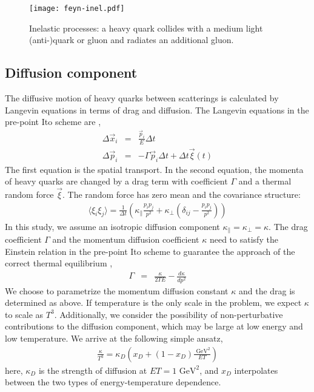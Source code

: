 \documentclass[aps, prc, reprint, amsmath, groupedaddress, nofootinbib]{revtex4-1}
\newcommand{\Kpara}{\kappa_{\|}}
\newcommand{\Kperp}{\kappa_{\perp}}
\begin{document}
\begin{figure}
\texttt{[image: feyn-inel.pdf]}
\caption{Inelastic processes: a heavy quark collides with a medium light (anti-)quark or gluon and radiates an additional gluon.}\label{plots:feyn-inelastic}
\end{figure}

\subsection{Diffusion component}
The diffusive motion of heavy quarks between scatterings is calculated by   Langevin equations in terms of drag and diffusion.
The Langevin equations in the pre-point Ito scheme are \cite{Rapp:2009my},
\begin{eqnarray}
\Delta \vec{x}_i &=& \frac{\vec{p}_i}{E} \Delta t	\\
\Delta \vec{p}_i &=& -\Gamma \vec{p}_i \Delta t + \Delta t \vec{\xi}(t)
\end{eqnarray}
The first equation is the spatial transport.
In the second equation, the momenta of heavy quarks are changed by a drag term with coefficient $\Gamma$ and a thermal random force $\vec{\xi}$. 
The random force has zero mean and the covariance structure:
\begin{eqnarray}
\langle \xi_i \xi_j \rangle = \frac{1}{\Delta t}\left(\Kpara \frac{p_i p_j}{p^2} + \Kperp \left(\delta_{ij} - \frac{p_i p_j}{p^2}\right) \right)
\end{eqnarray}
In this study, we assume an isotropic diffusion component $\Kpara=\Kperp=\kappa$.
The drag coefficient $\Gamma$ and the momentum diffusion coefficient $\kappa$ need to satisfy the Einstein relation in the pre-point Ito scheme to guarantee the approach of the correct thermal equilibrium \cite{Rapp:2009my},
\begin{eqnarray}
\Gamma &=& \frac{\kappa}{2TE} - \frac{d\kappa}{dp^2}
\end{eqnarray}
We choose to parametrize the momentum diffusion constant $\kappa$ and the drag is determined as above.
If temperature is the only scale in the problem, we expect $\kappa$ to scale as $T^3$.
Additionally, we consider the possibility of non-perturbative contributions to the diffusion component, which may be large at low energy and low temperature. We arrive at the following simple ansatz,
\begin{eqnarray}
\frac{\kappa}{T^3} = \kappa_D\left(x_D + (1-x_D)\frac{\textrm{ GeV}^2}{ET}\right)
\end{eqnarray}
here, $\kappa_D$ is the strength of diffusion at $ET = 1\textrm{ GeV}^2$, and $x_D$ interpolates between the two types of energy-temperature dependence.
\end{document}
